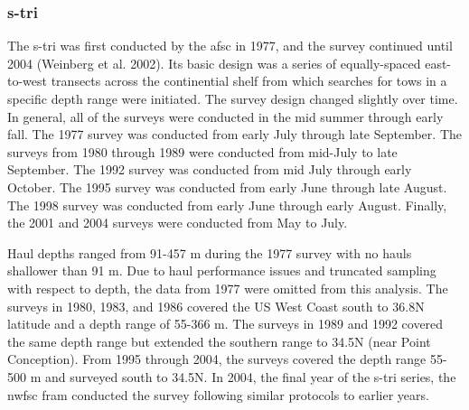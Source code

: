 \documentclass[11pt,
  english,
  a4paper,
]{article}
\begin{document}
\leavevmode\tagmcend\tagstructend\par


\hypertarget{section-1}{%
\subsubsection{\texorpdfstring{\acrlong{s-tri}}{}}\label{section-1}}

\leavevmode\tagmcend\tagstructend


The \gls{s-tri} was first conducted by the \gls{afsc} in 1977, and the survey continued until 2004 {(Weinberg et al. 2002)\leavevmode\tagmcend\tagstructend}. Its basic design was a series of equally-spaced east-to-west transects across the continential shelf from which searches for tows in a specific depth range were initiated. The survey design changed slightly over time. In general, all of the surveys were conducted in the mid summer through early fall. The 1977 survey was conducted from early July through late September. The surveys from 1980 through 1989 were conducted from mid-July to late September. The 1992 survey was conducted from mid July through early October. The 1995 survey was conducted from early June through late August. The 1998 survey was conducted from early June through early August. Finally, the 2001 and 2004 surveys were conducted from May to July.

\leavevmode\tagmcend\tagstructend\par


Haul depths ranged from 91-457 m during the 1977 survey with no hauls shallower than 91 m. Due to haul performance issues and truncated sampling with respect to depth, the data from 1977 were omitted from this analysis. The surveys in 1980, 1983, and 1986 covered the US West Coast south to 36.8\textdegree N latitude and a depth range of 55-366 m. The surveys in 1989 and 1992 covered the same depth range but extended the southern range to 34.5\textdegree N (near Point Conception). From 1995 through 2004, the surveys covered the depth range 55-500 m and surveyed south to 34.5\textdegree N. In 2004, the final year of the \gls{s-tri} series, the \gls{nwfsc} \gls{fram} conducted the survey following similar protocols to earlier years.
\end{document}
